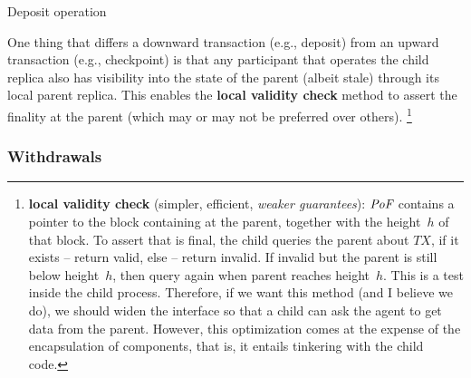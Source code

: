 \begin{algorithm}[H]
\footnotesize
\caption{Deposit operation}\label{alg:deposit}
  \DontPrintSemicolon
\end{algorithm}
One thing that differs a downward transaction (e.g., deposit) from an upward transaction (e.g., checkpoint) is that any participant that operates the child \smr replica also has visibility into the state of the parent \smr (albeit stale) through its local parent \smr replica. This enables the \textbf{local validity check} method to assert the finality at the parent (which may or may not be preferred over others).%
\footnote{\textbf{local validity check} (simpler, efficient, \textit{weaker guarantees}): $\textit{PoF}$ contains a pointer to the block containing \tx  at the parent, together with the height~$h$ of that block.
 To assert that \tx is final, the child queries the parent about $TX$, if it exists -- return valid, else -- return invalid. If invalid but the parent is still below height~$h$, then query again when parent reaches height~$h$.
This is a test inside the child \smr process. Therefore, if we want this method (and I believe we do), we should widen the interface so that a child \smr can ask the agent to get data from the parent. However, this optimization comes at the expense of the encapsulation of components, that is, it entails tinkering with the child \smr code.}
            
\subsubsection{Withdrawals}
\label{sec:withdraw}

